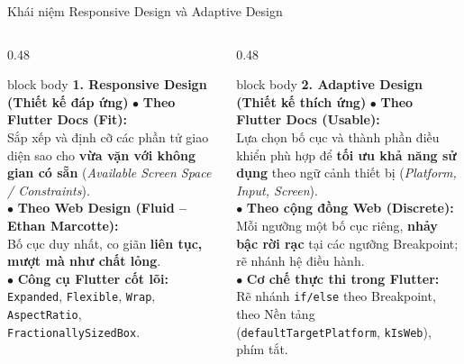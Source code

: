 \documentclass[aspectratio=169, 10pt]{beamer}
\begin{document}
\begin{frame}{Khái niệm Responsive Design và Adaptive Design}
  \vspace{-0.2cm}
  \begin{columns}[T]
    \begin{column}{0.48\textwidth}
      \begin{beamercolorbox}[rounded=true, shadow=false, wd=\textwidth, sep=4pt]{block body}
        \textbf{\normalsize\color{blue!80!black}1. Responsive Design (Thiết kế đáp ứng)}
        \vskip 0.06cm
        \footnotesize
        $\bullet$ \textbf{Theo Flutter Docs (Fit):}\\
        Sắp xếp và định cỡ các phần tử giao diện sao cho \textbf{vừa vặn với không gian có sẵn} (\textit{Available Screen Space / Constraints}).\\[0.08cm]
        $\bullet$ \textbf{Theo Web Design (Fluid -- Ethan Marcotte):}\\
        Bố cục duy nhất, co giãn \textbf{liên tục, mượt mà như chất lỏng}.\\[0.08cm]
        $\bullet$ \textbf{Công cụ Flutter cốt lõi:}\\
        \texttt{Expanded}, \texttt{Flexible}, \texttt{Wrap}, \texttt{AspectRatio}, \texttt{FractionallySizedBox}.
      \end{beamercolorbox}
    \end{column}

    \begin{column}{0.48\textwidth}
      \begin{beamercolorbox}[rounded=true, shadow=false, wd=\textwidth, sep=4pt]{block body}
        \textbf{\normalsize\color{blue!80!black}2. Adaptive Design (Thiết kế thích ứng)}
        \vskip 0.06cm
        \footnotesize
        $\bullet$ \textbf{Theo Flutter Docs (Usable):}\\
        Lựa chọn bố cục và thành phần điều khiển phù hợp để \textbf{tối ưu khả năng sử dụng} theo ngữ cảnh thiết bị (\textit{Platform, Input, Screen}).\\[0.08cm]
        $\bullet$ \textbf{Theo cộng đồng Web (Discrete):}\\
        Mỗi ngưỡng một bố cục riêng, \textbf{nhảy bậc rời rạc} tại các ngưỡng Breakpoint; rẽ nhánh hệ điều hành.\\[0.08cm]
        $\bullet$ \textbf{Cơ chế thực thi trong Flutter:}\\
        Rẽ nhánh \texttt{if/else} theo Breakpoint, theo Nền tảng (\texttt{defaultTargetPlatform}, \texttt{kIsWeb}), phím tắt.
      \end{beamercolorbox}
    \end{column}
  \end{columns}


\end{frame}
\end{document}
